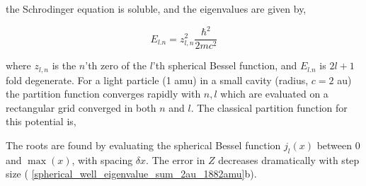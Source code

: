 \documentclass[../main.tex]{subfiles}
\begin{document}
the Schrodinger equation is soluble,\cite{Huang2016} and the eigenvalues are given by,

\begin{equation}
E_{l.n} = z_{l, n}^2 \frac{\hbar^2}{2mc^2}
\end{equation}

where $z_{l, n}$ is the $n$'th zero of the $l$'th spherical Bessel function, and $E_{l.n}$ is $2l+1$ fold degenerate. For a light particle (1 amu) in a small cavity (radius, $c = 2$ au) the partition function converges rapidly with $n, l$ which are evaluated on a rectangular grid converged in both $n$ and $l$. The classical partition function for this potential is,



\iffalse
The roots are found by evaluating the spherical Bessel function $j_l(x)$ between 0 and $\max(x)$, with spacing $\delta x$. The error in $Z$ decreases dramatically with step size (\figurename{ \ref{spherical_well_eigenvalue_sum_2au_1882amu}}b).
\end{document}
